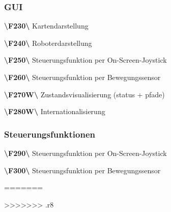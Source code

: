 \documentclass[10pt,a4paper]{article}
\begin{document}
			\subsubsection{GUI}
				\begin{list}{}{\leftmargin=1cm}
					\item[\textbf{\textbackslash F230\textbackslash}] Kartendarstellung
					\item[\textbf{\textbackslash F240\textbackslash}] Roboterdarstellung					
					\item[\textbf{\textbackslash F250\textbackslash}] Steuerungsfunktion per On-Screen-Joystick
					\item[\textbf{\textbackslash F260\textbackslash}] Steuerungsfunktion per Bewegungssensor					
					\item[\textbf{\textbackslash F270W\textbackslash}] Zustandsvisualisierung (status + pfade)		
					\item[\textbf{\textbackslash F280W\textbackslash}] Internationalisierung	
				\end{list}		
			\subsubsection{Steuerungsfunktionen}		
				\begin{list}{}{\leftmargin=1cm}
					\item[\textbf{\textbackslash F290\textbackslash}] Steuerungsfunktion per On-Screen-Joystick
					\item[\textbf{\textbackslash F300\textbackslash}] Steuerungsfunktion per Bewegungssensor					
				\end{list}				
=======
			
			
>>>>>>> .r8
\end{document}
